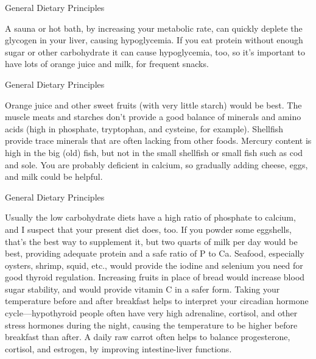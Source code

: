 \documentclass[11pt,oneside,openany,extrafontsizes]{memoir}
\begin{document}
\begin{standalonequote}{General Dietary Principles}

    \begin{answer}
        A sauna or hot bath, by increasing your metabolic rate, can quickly deplete the glycogen in your liver, causing hypoglycemia. If you eat protein without enough sugar or other carbohydrate it can cause hypoglycemia, too, so it's important to have lots of orange juice and milk, for frequent snacks.
    \end{answer}
\end{standalonequote}

\begin{standalonequote}{General Dietary Principles}

    \begin{answer}
        Orange juice and other sweet fruits (with very little starch) would be best. The muscle meats and starches don't provide a good balance of minerals and amino acids (high in phosphate, tryptophan, and cysteine, for example). Shellfish provide trace minerals that are often lacking from other foods. Mercury content is high in the big (old) fish, but not in the small shellfish or small fish such as cod and sole. You are probably deficient in calcium, so gradually adding cheese, eggs, and milk could be helpful.
    \end{answer}
\end{standalonequote}

\begin{standalonequote}{General Dietary Principles}

    \begin{answer}
        Usually the low carbohydrate diets have a high ratio of phosphate to calcium, and I suspect that your present diet does, too. If you powder some eggshells, that's the best way to supplement it, but two quarts of milk per day would be best, providing adequate protein and a safe ratio of P to Ca. Seafood, especially oysters, shrimp, squid, etc., would provide the iodine and selenium you need for good thyroid regulation. Increasing fruits in place of bread would increase blood sugar stability, and would provide vitamin C in a safer form. Taking your temperature before and after breakfast helps to interpret your circadian hormone cycle---hypothyroid people often have very high adrenaline, cortisol, and other stress hormones during the night, causing the temperature to be higher before breakfast than after. A daily raw carrot often helps to balance progesterone, cortisol, and estrogen, by improving intestine-liver functions.
    \end{answer}
\end{standalonequote}
\end{document}
